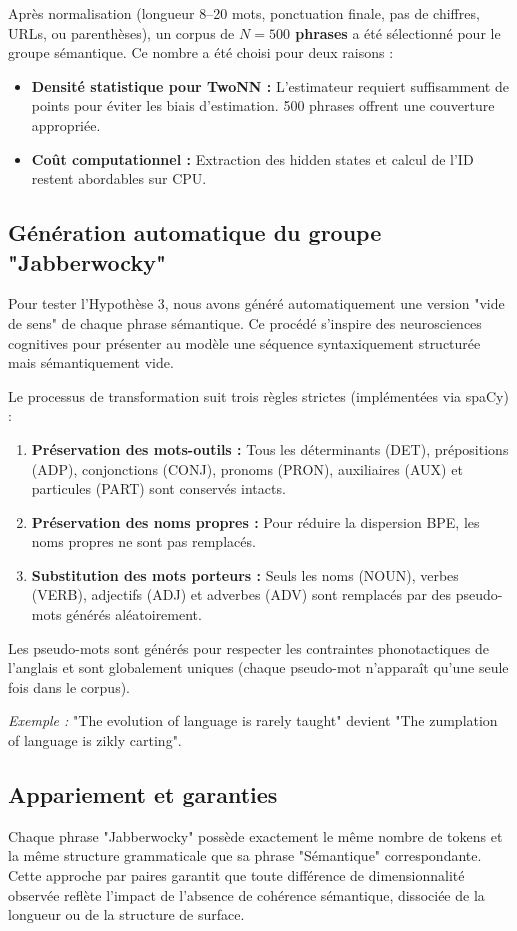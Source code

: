 Après normalisation (longueur 8--20 mots, ponctuation finale, pas de chiffres, URLs, ou parenthèses), un corpus de \textbf{$N = 500$ phrases} a été sélectionné pour le groupe sémantique. Ce nombre a été choisi pour deux raisons :
\begin{itemize}
    \item \textbf{Densité statistique pour TwoNN :} L'estimateur requiert suffisamment de points pour éviter les biais d'estimation. 500 phrases offrent une couverture appropriée.
    \item \textbf{Coût computationnel :} Extraction des hidden states et calcul de l'ID restent abordables sur CPU.
\end{itemize}

\subsection{Génération automatique du groupe "Jabberwocky"}
Pour tester l'Hypothèse 3, nous avons généré automatiquement une version "vide de sens" de chaque phrase sémantique. Ce procédé s'inspire des neurosciences cognitives pour présenter au modèle une séquence syntaxiquement structurée mais sémantiquement vide.

Le processus de transformation suit trois règles strictes (implémentées via spaCy) :
\begin{enumerate}
    \item \textbf{Préservation des mots-outils :} Tous les déterminants (DET), prépositions (ADP), conjonctions (CONJ), pronoms (PRON), auxiliaires (AUX) et particules (PART) sont conservés intacts.
    \item \textbf{Préservation des noms propres :} Pour réduire la dispersion BPE, les noms propres ne sont pas remplacés.
    \item \textbf{Substitution des mots porteurs :} Seuls les noms (NOUN), verbes (VERB), adjectifs (ADJ) et adverbes (ADV) sont remplacés par des pseudo-mots générés aléatoirement.
\end{enumerate}

Les pseudo-mots sont générés pour respecter les contraintes phonotactiques de l'anglais et sont globalement uniques (chaque pseudo-mot n'apparaît qu'une seule fois dans le corpus).

\textit{Exemple :} "The evolution of language is rarely taught" devient "The zumplation of language is zikly carting".

\subsection{Appariement et garanties}
Chaque phrase "Jabberwocky" possède exactement le même nombre de tokens et la même structure grammaticale que sa phrase "Sémantique" correspondante. Cette approche par paires garantit que toute différence de dimensionnalité observée reflète l'impact de l'absence de cohérence sémantique, dissociée de la longueur ou de la structure de surface.

